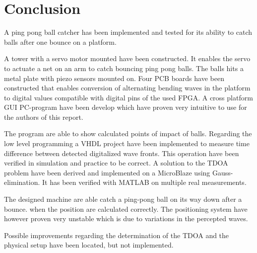 \chapter{Conclusion}
\label{chap:conclusion}
	A ping pong ball catcher has been implemented and tested for its ability to catch balls after one bounce on a platform.

	A tower with a servo motor mounted have been constructed. It enables the servo to actuate a net on an arm to catch bouncing ping pong balls.
	The balls hits a metal plate with piezo sensors mounted on.
	Four PCB boards have been constructed that enables conversion of alternating bending waves in the platform to digital values compatible with digital pins of the used FPGA.
	A cross platform GUI PC-program have been develop which have proven very intuitive to use for the authors of this report.

	The program are able to show calculated points of impact of balls.
	Regarding the low level programming a VHDL project have been implemented to measure time difference between detected digitalized wave fronts. This operation have been verified in simulation and practice to be correct.
	A solution to the TDOA problem have been derived and implemented on a MicroBlaze using Gauss-elimination.
	It has been verified with MATLAB on multiple real measurements.

	The designed machine are able catch a ping-pong ball on its way down after a bounce. when the position are calculated correctly.
	The positioning system have however proven very unstable which is due to variations in the percepted waves.

	Possible improvements regarding the determination of the TDOA and the physical setup have been located, but not implemented.



